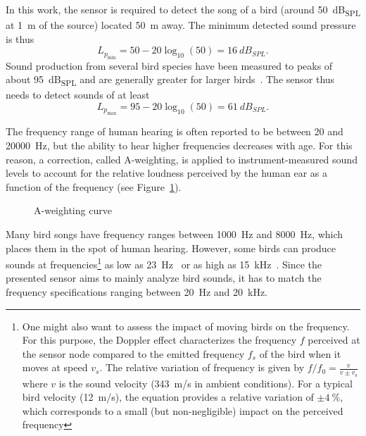 \documentclass{EPL-master-thesis-covers-EN}
\newcommand{\te}[1]{\textrm{#1}}
\begin{document}
\begin{table}[H]
\centering
{}
\caption{Typical sound pressure levels}
\label{tab:sound_levels}
\end{table}

In this work, the sensor is required to detect the song of a bird (around \SI{50}{dB_{SPL}} at \SI{1}{m} of the source) located \SI{50}{m} away. The minimum detected sound pressure is thus
\[
 L_{p_\te{min}} = 50 - 20\log_{10}(50) = \SI{16}{dB_{SPL}}.
\]
Sound production from several bird species have been measured to peaks of about \SI{95}{dB_{SPL}} and are generally greater for larger birds~\cite{FHWA}. The sensor thus needs to detect sounds of at least
\[
 L_{p_\te{max}} = 95 - 20\log_{10}(50) = \SI{61}{dB_{SPL}}.
\]

The frequency range of human hearing is often reported to be between 20 and \SI{20000}{Hz}, but the ability to hear higher frequencies decreases with age. For this reason, a correction, called A-weighting, is applied to instrument-measured sound levels to account for the relative loudness perceived by the human ear as a function of the frequency (see Figure~\ref{fig:a_weighting}).

\begin{figure}[H]
    \centering
    
    \caption{A-weighting curve}
    \label{fig:a_weighting}
\end{figure}

Many bird songs have frequency ranges between \SI{1000}{Hz} and \SI{8000}{Hz}, which places them in the spot of human hearing. However, some birds can produce sounds at frequencies\footnote{One might also want to assess the impact of moving birds on the frequency. For this purpose, the Doppler effect characterizes the frequency $f$ perceived at the sensor node compared to the emitted frequency $f_s$ of the bird when it moves at speed $v_s$. The relative variation of frequency is given by $ f/f_0 = \frac{v}{v \pm v_\text{s}}$ where $v$ is the sound velocity (\SI{343}{m/s} in ambient conditions). For a typical bird velocity (\SI{12}{m/s}), the equation provides a relative variation of $\pm \SI{4}{\%}$, which corresponds to a small (but non-negligible) impact on the perceived frequency} as low as \SI{23}{Hz}~\cite{10.2307/4090277} or as high as \SI{15}{kHz}~\cite{doi:10.1111/j.1474-919X.1962.tb08647.x}. Since the presented sensor aims to mainly analyze bird sounds, it has to match the frequency specifications ranging between \SI{20}{Hz} and \SI{20}{kHz}.
\end{document}
